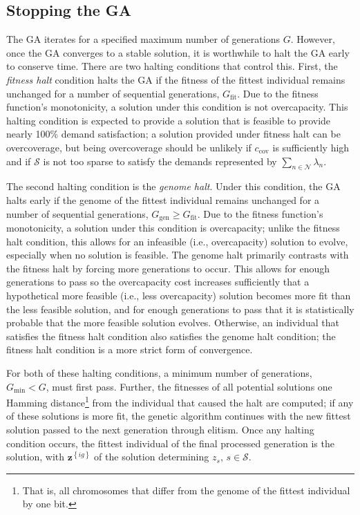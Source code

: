 \documentclass[12pt,dvipsnames]{report}
\begin{document}
\subsection{Stopping the GA} \label{subsec:ga_stop}

The GA iterates for a specified maximum number of generations $G$.  However, once the GA converges to a stable solution, it is worthwhile to halt the GA early to conserve time.  There are two halting conditions that control this.  First, the \emph{fitness halt} condition halts the GA if the fitness of the fittest individual remains unchanged for a number of sequential generations, $G_{\text{fit}}$.  Due to the fitness function's monotonicity, a solution under this condition is not overcapacity.  This halting condition is expected to provide a solution that is feasible to provide nearly 100\% demand satisfaction; a solution provided under fitness halt can be overcoverage, but being overcoverage should be unlikely if $c_{\text{cov}}$ is sufficiently high and if $\mathcal{S}$ is not too sparse to satisfy the demands represented by $\sum_{n \in \mathcal{N}} \lambda_n$.

The second halting condition is the \emph{genome halt}.  Under this condition, the GA halts early if the genome of the fittest individual remains unchanged for a number of sequential generations, $G_{\text{gen}} \geq G_{\text{fit}}$.  Due to the fitness function's monotonicity, a solution under this condition is overcapacity; unlike the fitness halt condition, this allows for an infeasible (i.e., overcapacity) solution to evolve, especially when no solution is feasible.  The genome halt primarily contrasts with the fitness halt by forcing more generations to occur.  This allows for enough generations to pass so the overcapacity cost increases sufficiently that a hypothetical more feasible (i.e., less overcapacity) solution becomes more fit than the less feasible solution, and for enough generations to pass that it is statistically probable that the more feasible solution evolves.  Otherwise, an individual that satisfies the fitness halt condition also satisfies the genome halt condition; the fitness halt condition is a more strict form of convergence.

For both of these halting conditions, a minimum number of generations, $G_{\min} < G$, must first pass.  Further, the fitnesses of all potential solutions one Hamming distance\footnote{That is, all chromosomes that differ from the genome of the fittest individual by one bit.} from the individual that caused the halt are computed; if any of these solutions is more fit, the genetic algorithm continues with the new fittest solution passed to the next generation through elitism.  Once any halting condition occurs, the fittest individual of the final processed generation is the solution, with $\textbf{z}^{\left\{ ig \right\}}$ of the solution determining $z_s,\, s \in \mathcal{S}$.
\end{document}
